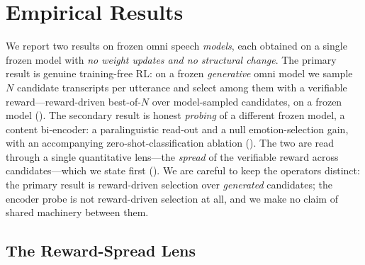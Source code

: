 \section{Empirical Results}
\label{sec:feasibility}

We report two results on frozen omni speech \emph{models}, each obtained on a single frozen model with \emph{no weight updates and no structural change}. The primary result is genuine training-free RL: on a frozen \emph{generative} omni model we sample $N$ candidate transcripts per utterance and select among them with a verifiable reward---reward-driven best-of-$N$ over model-sampled candidates, on a frozen model (). The secondary result is honest \emph{probing} of a different frozen model, a content bi-encoder: a paralinguistic read-out and a null emotion-selection gain, with an accompanying zero-shot-classification ablation (). The two are read through a single quantitative lens---the \emph{spread} of the verifiable reward across candidates---which we state first (). We are careful to keep the operators distinct: the primary result is reward-driven selection over \emph{generated} candidates; the encoder probe is not reward-driven selection at all, and we make no claim of shared machinery between them.

\subsection{The Reward-Spread Lens}
\label{sec:res:lens}

